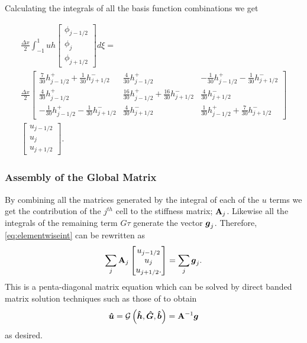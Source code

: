 Calculating the integrals of all the basis function combinations we get

\begin{multline}
\frac{\Delta x}{2}\int_{-1 }^{1}  uh \begin{bmatrix}
\phi_{j-1/2}\\\phi_j \\\phi_{j+1/2}
\end{bmatrix} d\xi =  \\  \frac{\Delta x}{2} \begin{bmatrix}
\frac{7}{30 } h^+_{j-1/2} + \frac{1}{30} h^-_{j+1/2} & \frac{4}{30 } h^+_{j-1/2}   & -\frac{1}{30 } h^+_{j-1/2} - \frac{1}{30} h^-_{j+1/2}\\\frac{4}{30 } h^+_{j-1/2} & \frac{16}{30 } h^+_{j-1/2} + \frac{16}{30} h^-_{j+1/2}&  \frac{4}{30} h^-_{j+1/2}\\ -\frac{1}{30 } h^+_{j-1/2} - \frac{1}{30} h^-_{j+1/2} &  \frac{4}{30 } h^-_{j+1/2} & \frac{1}{30 } h^+_{j-1/2} + \frac{7}{30} h^-_{j+1/2}
\end{bmatrix} \\  \begin{bmatrix}
u_{j-1/2}\\u_j \\u _{j+1/2}
\end{bmatrix}.
\end{multline}

\subsubsection{Assembly of the Global Matrix}
By combining all the matrices generated by the integral of each of the $u$ terms we get the contribution of the $j^{th}$ cell to the stiffness matrix; $\mathbf{A}_j$. Likewise all the integrals of the remaining term $G\tau$ generate the vector $\boldsymbol{g}_{j}$. Therefore, \eqref{eq:elementwiseint} can be rewritten as
\begin{equation}
\label{eqn:FEMElemMatrixJ}
\sum_j \mathbf{A}_j \begin{bmatrix}
u_{j-1/2}\\u_j \\u _{j+1/2}.
\end{bmatrix} = \sum_j \boldsymbol{g}_j.
\end{equation}
This is a penta-diagonal matrix equation which can be solved by direct banded matrix solution techniques such as those of \citet{NumRecC-1996} to obtain
\begin{equation}
\boldsymbol{\hat{u}} =\mathcal{G}\left( \boldsymbol{\hat{h}}, \boldsymbol{\hat{G}},\boldsymbol{\hat{b}} \right) =   \mathbf{A}^{-1}\boldsymbol{g}
\label{eqn:usolvefromGhb}
\end{equation}
as desired.
